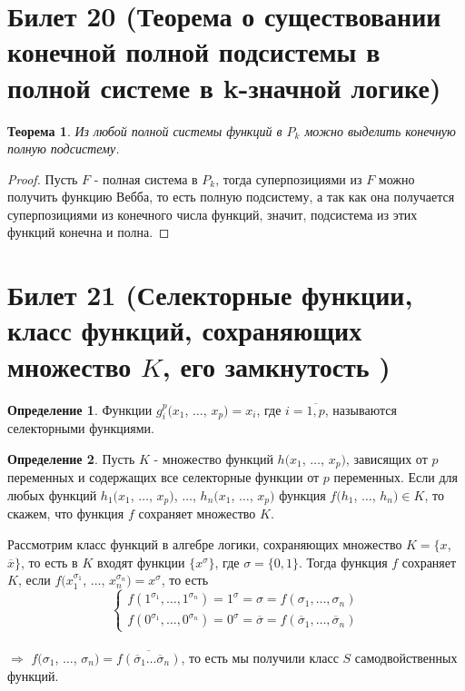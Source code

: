 \documentclass[a4paper, 12pt]{article}
\theoremstyle{definition}
\newtheorem*{definition}{Определение}
\theoremstyle{plain}
\newtheorem*{theorem}{Теорема}
\theoremstyle{remark}
\begin{document}
  \section{Билет 20 (Теорема о существовании конечной полной подсистемы в полной системе в k-значной логике)}
  \begin{theorem}
    Из любой полной системы функций в $P_k$ можно выделить конечную полную подсистему.
  \end{theorem}
  \begin{proof}
    Пусть $F$ - полная система в $P_k$, тогда суперпозициями из $F$ можно получить функцию Вебба, то есть полную подсистему, а так как она получается суперпозициями из конечного числа функций, значит, подсистема из этих функций конечна и полна.
  \end{proof}
  \section{Билет 21 (Селекторные функции, класс функций, сохраняющих множество $K$, его замкнутость )}
  \begin{definition}
    Функции $g_i^p(x_1$, $\ldots$, $x_p)=x_i$, где $i=\overline{1,p}$,  называются селекторными функциями.
  \end{definition}
  \begin{definition}
    Пусть $K$ - множество функций $h(x_1$, $\ldots$, $x_p)$, зависящих от $p$ переменных и содержащих все селекторные функции от $p$ переменных. Если для любых функций $h_1(x_1$, $\ldots$, $x_p)$, $\ldots$, $h_n(x_1$, $\ldots$, $x_p)$ функция $f(h_1$, $\ldots$, $h_n)\in K$, то скажем, что функция $f$ сохраняет множество $K$.
  \end{definition}
  Рассмотрим класс функций в алгебре логики, сохраняющих множество $K=\{x$, $\overline{x}\}$, то есть в $K$ входят функции $\{x^{\sigma}\}$, где $\sigma=\{0, 1\}$. Тогда функция $f$ сохраняет $K$, если $f(x_1^{\sigma_1}$, $\ldots$, $x_n^{\sigma_n})=x^{\sigma}$, то есть
  $$\begin{cases}
    f(1^{\sigma_1}, \ldots, 1^{\sigma_n})=1^{\sigma}=\sigma=f(\sigma_1, \ldots, \sigma_n)\\
    f(0^{\sigma_1}, \ldots, 0^{\sigma_n})=0^{\sigma}=\overline{\sigma}=f(\overline{\sigma}_1, \ldots, \overline{\sigma}_n)
  \end{cases}$$\\
  $\Longrightarrow$ $f(\sigma_1$, $\ldots$, $\sigma_n)=\overline{f(\overline{\sigma}_1 \ldots \overline{\sigma}_n)}$, то есть мы получили класс $S$ самодвойственных функций.
\end{document}
